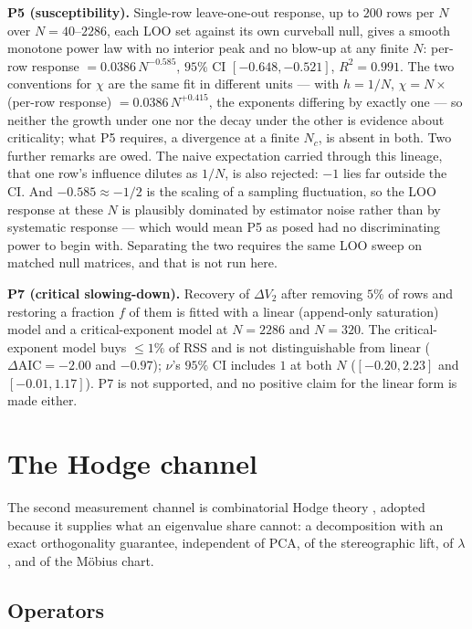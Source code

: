 \documentclass[11pt,a4paper]{article}
\theoremstyle{plain}
\theoremstyle{remark}
\theoremstyle{plain}
\begin{document}
\textbf{P5 (susceptibility).} Single-row leave-one-out response, up to $200$ rows
per $N$ over $N=40$--$2286$, each LOO set against its own curveball null, gives a
smooth monotone power law with no interior peak and no blow-up at any finite $N$:
per-row response $=0.0386\,N^{-0.585}$, $95\%$ CI $[-0.648,-0.521]$, $R^2=0.991$.
The two conventions for $\chi$ are the same fit in different units --- with
$h=1/N$, $\chi=N\times$(per-row response) $=0.0386\,N^{+0.415}$, the exponents
differing by exactly one --- so neither the growth under one nor the decay under
the other is evidence about criticality; what P5 requires, a divergence at a
finite $N_c$, is absent in both. Two further remarks are owed. The naive
expectation carried through this lineage, that one row's influence dilutes as
$1/N$, is also rejected: $-1$ lies far outside the CI. And $-0.585\approx-1/2$ is
the scaling of a sampling fluctuation, so the LOO response at these $N$ is
plausibly dominated by estimator noise rather than by systematic response ---
which would mean P5 as posed had no discriminating power to begin with. Separating
the two requires the same LOO sweep on matched null matrices, and that is not run
here.

\textbf{P7 (critical slowing-down).} Recovery of $\Delta V_2$ after removing
$5\%$ of rows and restoring a fraction $f$ of them is fitted with a linear
(append-only saturation) model and a critical-exponent model at $N=2286$ and
$N=320$. The critical-exponent model buys $\le1\%$ of RSS and is not
distinguishable from linear ($\Delta\mathrm{AIC}=-2.00$ and $-0.97$); $\nu$'s
$95\%$ CI includes $1$ at both $N$ ($[-0.20,2.23]$ and $[-0.01,1.17]$). P7 is not
supported, and no positive claim for the linear form is made either.

\section{The Hodge channel}
\label{sec:hodge}

The second measurement channel is combinatorial Hodge theory \citep{jlyy2011}, adopted because it supplies what an eigenvalue share cannot: a decomposition with an exact orthogonality guarantee, independent of PCA, of the stereographic lift, of $\lambda$, and of the M\"obius chart.

\subsection{Operators}
\end{document}
